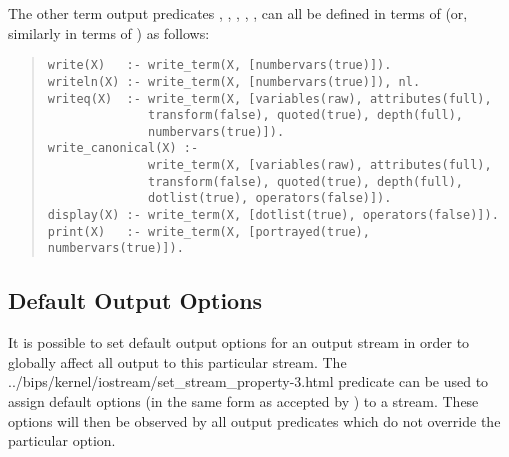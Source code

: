 The other term output predicates
,
,
,
,
,
can all be defined in terms of  (or, similarly
in terms of ) as follows:
\begin{quote}
\begin{verbatim}
write(X)   :- write_term(X, [numbervars(true)]).
writeln(X) :- write_term(X, [numbervars(true)]), nl.
writeq(X)  :- write_term(X, [variables(raw), attributes(full),
              transform(false), quoted(true), depth(full),
              numbervars(true)]).
write_canonical(X) :-
              write_term(X, [variables(raw), attributes(full),
              transform(false), quoted(true), depth(full),
              dotlist(true), operators(false)]).
display(X) :- write_term(X, [dotlist(true), operators(false)]).
print(X)   :- write_term(X, [portrayed(true), numbervars(true)]).
\end{verbatim}
\end{quote}


\subsection{Default Output Options}

It is possible to set default output options for an output stream
in order to globally affect all output to this particular stream.
The
%
{../bips/kernel/iostream/set_stream_property-3.html}
predicate can be used to assign default options (in the same form as
accepted by ) to a stream.
These options will then be observed by all output predicates which do not
override the particular option.

